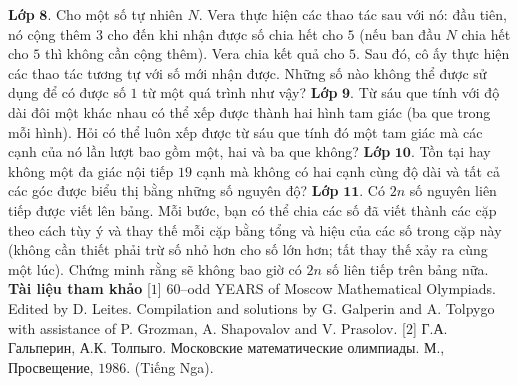 \begin{multicols}{2}
\begin{figure}[H]
\begin{tikzpicture}[cackithi,scale=0.7]
		\end{tikzpicture}
		\vspace*{-5pt}
	\end{figure}
	\textbf{\color{cackithi}Lớp} $\pmb{8.}$ Cho một số tự nhiên $N$. Vera thực hiện các thao tác sau với nó: đầu tiên, nó cộng thêm $3$ cho đến khi nhận được số chia hết cho $5$ (nếu ban đầu $N$ chia hết cho $5$ thì không cần cộng thêm). Vera chia kết quả cho $5$. Sau đó, cô ấy thực hiện các thao tác tương tự với số mới nhận được. Những số nào không thể được sử dụng để có được số $1$ từ một quá trình như vậy?
	\vskip 0.1cm
	\textbf{\color{cackithi}Lớp} $\pmb{9.}$ Từ sáu que tính với độ dài đôi một khác nhau có thể xếp được thành hai hình tam giác (ba que trong mỗi hình). Hỏi có thể luôn xếp được từ sáu que tính đó một tam giác mà các cạnh của nó lần lượt bao gồm một, hai và ba que không?
	\vskip 0.1cm
	\textbf{\color{cackithi}Lớp} $\pmb{10.}$ Tồn tại hay không một đa giác nội tiếp $19$ cạnh mà không có hai cạnh cùng độ dài và tất cả các góc được biểu thị bằng những số nguyên độ?
	\vskip 0.1cm
	\textbf{\color{cackithi}Lớp} $\pmb{11.}$ Có $2n$ số nguyên liên tiếp được viết lên bảng. Mỗi bước, bạn có thể chia các số đã viết thành các cặp theo cách tùy ý và thay thế mỗi cặp bằng tổng và hiệu của các số trong cặp này (không cần thiết phải trừ số nhỏ hơn cho số lớn hơn; tất thay thế xảy ra cùng một lúc). Chứng minh rằng sẽ không bao giờ có $2n$ số liên tiếp trên bảng nữa.
	\vskip 0.1cm
	\textbf{\color{cackithi}Tài liệu tham khảo}
	\vskip 0.1cm
	[$1$] $60$--odd YEARS of Moscow Mathematical Olympiads. Edited by D. Leites. Compilation and solutions by G. Galperin and A. Tolpygo with assistance of P. Grozman, A. Shapovalov and V. Prasolov.
	\vskip 0.1cm
	[$2$] Г.А. Гальперин, А.К. Толпыго. Московские математические олимпиады. М., Просвещение, $1986$. (Tiếng Nga). 
\end{multicols}
\newpage
\begingroup
